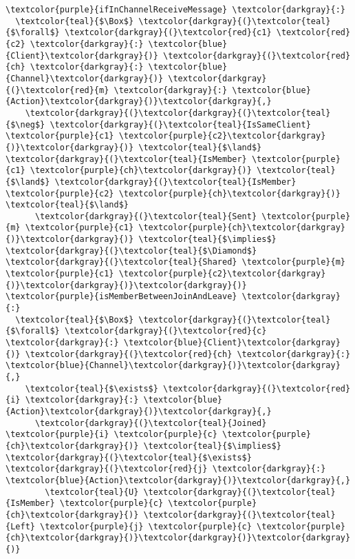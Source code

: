 \begin{Verbatim}[commandchars=\\\{\},codes={\catcode`$=3}]
\textcolor{purple}{ifInChannelReceiveMessage} \textcolor{darkgray}{:}
  \textcolor{teal}{$\Box$} \textcolor{darkgray}{(}\textcolor{teal}{$\forall$} \textcolor{darkgray}{(}\textcolor{red}{c1} \textcolor{red}{c2} \textcolor{darkgray}{:} \textcolor{blue}{Client}\textcolor{darkgray}{)} \textcolor{darkgray}{(}\textcolor{red}{ch} \textcolor{darkgray}{:} \textcolor{blue}{Channel}\textcolor{darkgray}{)} \textcolor{darkgray}{(}\textcolor{red}{m} \textcolor{darkgray}{:} \textcolor{blue}{Action}\textcolor{darkgray}{)}\textcolor{darkgray}{,}
    \textcolor{darkgray}{(}\textcolor{darkgray}{(}\textcolor{teal}{$\neg$} \textcolor{darkgray}{(}\textcolor{teal}{IsSameClient} \textcolor{purple}{c1} \textcolor{purple}{c2}\textcolor{darkgray}{)}\textcolor{darkgray}{)} \textcolor{teal}{$\land$} \textcolor{darkgray}{(}\textcolor{teal}{IsMember} \textcolor{purple}{c1} \textcolor{purple}{ch}\textcolor{darkgray}{)} \textcolor{teal}{$\land$} \textcolor{darkgray}{(}\textcolor{teal}{IsMember} \textcolor{purple}{c2} \textcolor{purple}{ch}\textcolor{darkgray}{)} \textcolor{teal}{$\land$}
      \textcolor{darkgray}{(}\textcolor{teal}{Sent} \textcolor{purple}{m} \textcolor{purple}{c1} \textcolor{purple}{ch}\textcolor{darkgray}{)}\textcolor{darkgray}{)} \textcolor{teal}{$\implies$} \textcolor{darkgray}{(}\textcolor{teal}{$\Diamond$} \textcolor{darkgray}{(}\textcolor{teal}{Shared} \textcolor{purple}{m} \textcolor{purple}{c1} \textcolor{purple}{c2}\textcolor{darkgray}{)}\textcolor{darkgray}{)}\textcolor{darkgray}{)}
\textcolor{purple}{isMemberBetweenJoinAndLeave} \textcolor{darkgray}{:}
  \textcolor{teal}{$\Box$} \textcolor{darkgray}{(}\textcolor{teal}{$\forall$} \textcolor{darkgray}{(}\textcolor{red}{c} \textcolor{darkgray}{:} \textcolor{blue}{Client}\textcolor{darkgray}{)} \textcolor{darkgray}{(}\textcolor{red}{ch} \textcolor{darkgray}{:} \textcolor{blue}{Channel}\textcolor{darkgray}{)}\textcolor{darkgray}{,}
    \textcolor{teal}{$\exists$} \textcolor{darkgray}{(}\textcolor{red}{i} \textcolor{darkgray}{:} \textcolor{blue}{Action}\textcolor{darkgray}{)}\textcolor{darkgray}{,}
      \textcolor{darkgray}{(}\textcolor{teal}{Joined} \textcolor{purple}{i} \textcolor{purple}{c} \textcolor{purple}{ch}\textcolor{darkgray}{)} \textcolor{teal}{$\implies$} \textcolor{darkgray}{(}\textcolor{teal}{$\exists$} \textcolor{darkgray}{(}\textcolor{red}{j} \textcolor{darkgray}{:} \textcolor{blue}{Action}\textcolor{darkgray}{)}\textcolor{darkgray}{,}
        \textcolor{teal}{U} \textcolor{darkgray}{(}\textcolor{teal}{IsMember} \textcolor{purple}{c} \textcolor{purple}{ch}\textcolor{darkgray}{)} \textcolor{darkgray}{(}\textcolor{teal}{Left} \textcolor{purple}{j} \textcolor{purple}{c} \textcolor{purple}{ch}\textcolor{darkgray}{)}\textcolor{darkgray}{)}\textcolor{darkgray}{)}

\end{Verbatim}
